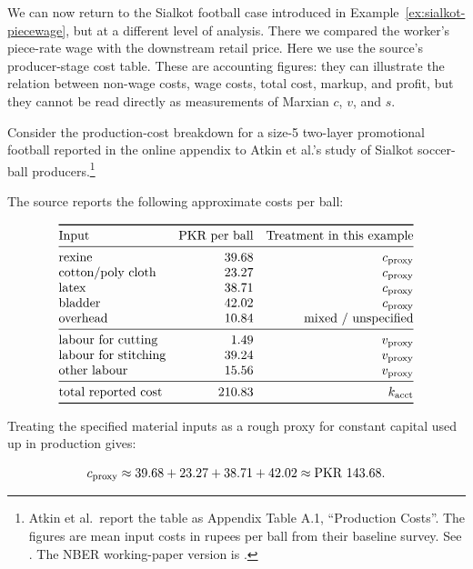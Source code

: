 \begin{example}
\label{ex:sialkot-costtable}

We can now return to the Sialkot football case introduced in
Example~\ref{ex:sialkot-piecewage}, but at a different level of analysis.
There we compared the worker's piece-rate wage with the downstream retail
price. Here we use the source's producer-stage cost table. These are accounting
figures: they can illustrate the relation between non-wage costs, wage costs,
total cost, markup, and profit, but they cannot be read directly as measurements
of Marxian \(c\), \(v\), and \(s\).

Consider the production-cost breakdown for a size-5 two-layer promotional
football reported in the online appendix to Atkin et al.'s study of Sialkot
soccer-ball producers.\footnote{Atkin et al.\ report the table as Appendix
Table A.1, ``Production Costs''. The figures are mean input costs in rupees per
ball from their baseline survey. See \cite{AtkinEtAl2017}. The NBER
working-paper version is \cite{AtkinEtAl2015NBER}.}

The source reports the following approximate costs per ball:

\[
\begin{array}{@{}lrr@{}}
\toprule
\text{Input} & \text{PKR per ball} & \text{Treatment in this example}\\
\midrule
\text{rexine} & 39.68 & c_{\text{proxy}}\\
\text{cotton/poly cloth} & 23.27 & c_{\text{proxy}}\\
\text{latex} & 38.71 & c_{\text{proxy}}\\
\text{bladder} & 42.02 & c_{\text{proxy}}\\
\text{overhead} & \SkOverhead{} & \text{mixed / unspecified}\\
\midrule
\text{labour for cutting} & 1.49 & v_{\text{proxy}}\\
\text{labour for stitching} & \SkStitch{} & v_{\text{proxy}}\\
\text{other labour} & 15.56 & v_{\text{proxy}}\\
\midrule
\text{total reported cost} & \kPKR{} & k_{\text{acct}}\\
\bottomrule
\end{array}
\]

Treating the specified material inputs as a rough proxy for constant capital
used up in production gives:

\[
c_{\text{proxy}}
\approx
39.68+23.27+38.71+42.02
\approx
\text{PKR }143.68{}.
\]


\end{example}
